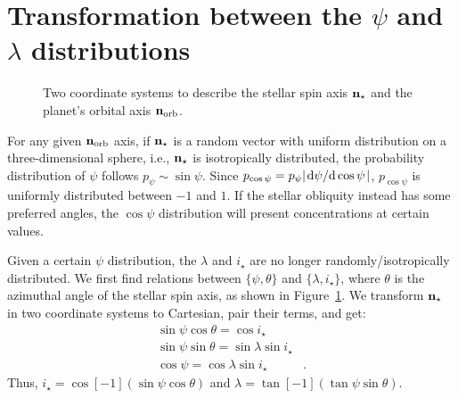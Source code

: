 \documentclass[twocolumn,times]{aastex631}
\begin{document}
\section{Transformation between the $\psi$ and $\lambda$ distributions}\label{sec:jacobian}

\begin{figure*}[ht!]
    \vspace*{-1.5cm}
    \caption{Two coordinate systems to describe the stellar spin axis $\bf{n}_{\star}$ and the planet's orbital axis $\bf{n}_{\rm orb}$.}
    \label{fig:coord}
\end{figure*}

For any given $\bf{n}_{\rm orb}$ axis, if $\bf{n}_{\star}$ is a random vector with uniform distribution on a three-dimensional sphere, i.e., $\bf{n}_{\star}$ is isotropically distributed, the probability distribution of $\psi$ follows $p_{\psi} \sim \sin{\psi}$. Since $p_{\cos{\psi}} = p_{\psi} \abs{\dv*{\psi}{\cos{\psi}}}$, $p_{\cos{\psi}}$ is uniformly distributed between $-1$ and $1$. If the stellar obliquity instead has some preferred angles, the $\cos{\psi}$ distribution will present concentrations at certain values.

Given a certain $\psi$ distribution, the $\lambda$ and $i_\star$ are no longer randomly/isotropically distributed. We first find relations between $\{\psi, \theta\}$ and $\{\lambda, i_\star\}$, where $\theta$ is the azimuthal angle of the stellar spin axis, as shown in Figure~\ref{fig:coord}. We transform $\bf{n}_{\star}$ in two coordinate systems to Cartesian, pair their terms, and get:
\begin{align}
    \sin{\psi}\cos{\theta} = \cos{i_\star}& \label{eq:coord1}\\
    \sin{\psi}\sin{\theta} = \sin{\lambda}\sin{i_\star}& \label{eq:coord2}\\
    \cos{\psi} = \cos{\lambda}\sin{i_\star} \label{eq:coord3}&.
\end{align}
Thus, $i_\star = \cos[-1](\sin{\psi}\cos{\theta})$ and $\lambda = \tan[-1](\tan{\psi}\sin{\theta})$. 
\end{document}
